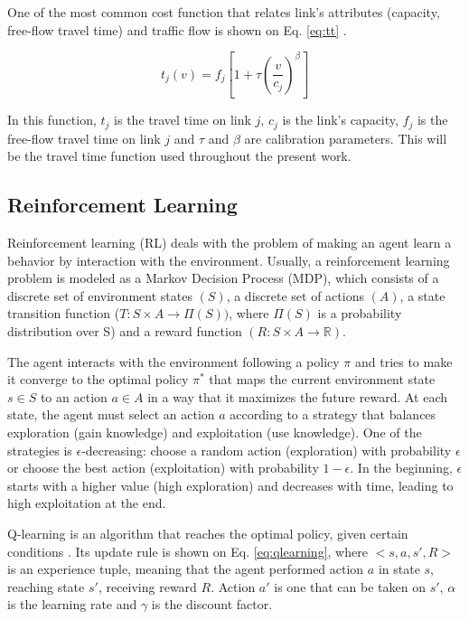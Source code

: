\documentclass{RITA}
\newcommand{\travTime}{\ensuremath{t_j}} 	%
\newcommand{\fftt}{\ensuremath{f_j}} 		%
\newcommand{\linkCap}{\ensuremath{c_j}}		%
\newcommand{\veh}{\ensuremath{v}}		%
\begin{document}
One of the most common cost function that relates link's attributes (capacity, free-flow travel time) and traffic flow is shown on Eq. \eqref{eq:tt} \cite{Ortuzar&Willumsen2001}.

\begin{equation}
\label{eq:tt}
\travTime(\veh) = \fftt[1 + \tau \left(\frac{\veh}{\linkCap}\right)^\beta]
\end{equation}

In this function, $\travTime$ is the travel time on link $j$, $\linkCap$ is the link's capacity, $\fftt$ is the free-flow travel time on link $j$ and $\tau$ and $\beta$ are calibration parameters. This will be the travel time function used throughout the present work.

\subsection{Reinforcement Learning}

Reinforcement learning (RL) deals with the problem of making an agent learn a behavior by interaction with the environment. Usually, a reinforcement learning problem is modeled as a Markov Decision Process (MDP), which consists of a discrete set of environment states $(S)$, a discrete set of actions $(A)$, a state transition function ($T: S \times A \to \Pi(S))$, where $\Pi(S)$ is a probability distribution over S) and a reward function $(R: S \times A \to \mathbb{R})$. %

The agent interacts with the environment following a policy $\pi$ and tries to make it converge to the optimal policy $\pi^*$ that maps the current environment state $s \in S$ to an action $a \in A$ in a way that it maximizes the future reward. At each state, the agent must select an action $a$ according to a strategy that balances exploration (gain knowledge) and exploitation (use knowledge). One of the strategies is $\epsilon$-decreasing: choose a random action (exploration) with probability $\epsilon$ or choose the best action (exploitation) with probability $1 - \epsilon$. In the beginning, $\epsilon$ starts with a higher value (high exploration) and decreases with time, leading to high exploitation at the end.

Q-learning is an algorithm that reaches the optimal policy, given certain conditions \cite{Kaelbling+1996}. Its update rule is shown on Eq. \eqref{eq:qlearning}, where \linebreak$<s,a,s',R>$ is an experience tuple, meaning that the agent performed action $a$ in state $s$, reaching state $s'$, receiving reward $R$. Action $a'$ is one that can be taken on $s'$, $\alpha$ is the learning rate and $\gamma$ is the discount factor.
\end{document}
